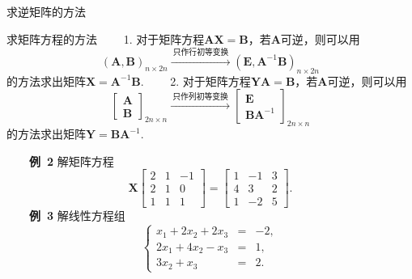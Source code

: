 \documentclass[compress,mathserif,cjk]{beamer}
\theoremstyle{remark}
\numberwithin{equation}{section}
\newcommand{\hei}{\bf}      %
\newcommand{\xiaoerhao}{\fontsize{18pt}{\baselineskip}\selectfont}  %
\begin{document}
\begin{CJK}{UTF8}{gbsn}
\begin{frame}{求逆矩阵的方法}
\end{frame}

\begin{frame}{求矩阵方程的方法}
\ \ \ \ 1. 对于矩阵方程$\bm{AX}=\bm B$，若$\bm A$可逆，则可以用
$$(\bm A,\bm B)_{n\times 2n}\xrightarrow{~\mbox{只作行初等变换}~}(\bm E,\bm A^{-1}\bm B)_{n\times 2n}$$
的方法求出矩阵$\bm X=\bm A^{-1}\bm B$.
\pause\vskip 10pt
\ \ \ \ 2. 对于矩阵方程$\bm{YA}=\bm B$，若$\bm A$可逆，则可以用
$$\left[\begin{matrix}\bm A\\\bm B\end{matrix}\right]_{2n\times n}\xrightarrow{~\mbox{只作列初等变换}~}\left[\begin{matrix}\bm E\ \ \ \ \\\bm {BA}^{-1}\end{matrix}\right]_{2n\times n}$$
的方法求出矩阵$\bm Y=\bm{BA}^{-1}$.

\end{frame}

\begin{frame}
\ \ \ \ {\hei 例~2} 解矩阵方程
$$\bm X\left[\begin{matrix}2&1&-1\\2&1&0\\1&1&1\end{matrix}\right]=\left[\begin{matrix}1&-1&3\\4&3&2\\1&-2&5\end{matrix}\right].$$
\pause\vskip 10pt
\ \ \ \ {\hei 例~3} 解线性方程组
$$\left\{\begin{array}{rcr}
x_1+2x_2+2x_3&=&-2,\\
2x_1+4x_2-x_3&=&1,\\
3x_2+x_3&=&2.
\end{array}\right.$$
\end{frame}




\begin{frame}
\begin{center}
{\textcolor[rgb]{0.50,0.00,1.00}{\textbf{\xiaoerhao{Thanks for your attention!}}}}\bigskip
\end{center}
\end{frame}
\end{CJK}
\end{document}
